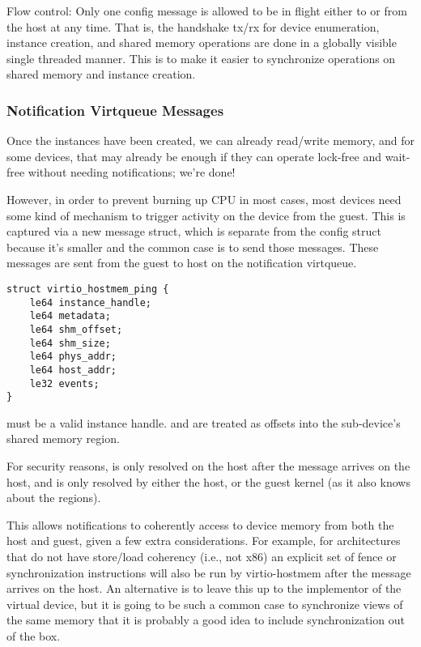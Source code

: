 Flow control: Only one config message is allowed to be in flight
either to or from the host at any time.
That is, the handshake tx/rx for device enumeration, instance creation, and shared memory operations
are done in a globally visible single threaded manner.
This is to make it easier to synchronize operations on shared memory and instance creation.

\subsubsection{Notification Virtqueue Messages}\label{sec:Device Types / Host Memory Device / Device Operation / Notification Virtqueue Messages}

Once the instances have been created,
we can already read/write memory, and for some devices, that may already be enough
if they can operate lock-free and wait-free without needing notifications; we're done!

However, in order to prevent burning up CPU in most cases,
most devices need some kind of mechanism to trigger activity on the device
from the guest. This is captured via a new message struct,
which is separate from the config struct because it's smaller and
the common case is to send those messages.
These messages are sent from the guest to host
on the notification virtqueue.

\begin{lstlisting}
struct virtio_hostmem_ping {
    le64 instance_handle;
    le64 metadata;
    le64 shm_offset;
    le64 shm_size;
    le64 phys_addr;
    le64 host_addr;
    le32 events;
}
\end{lstlisting}

 must be a valid instance handle.
 and 
are treated as offsets into the sub-device's shared memory region.

For security reasons,
 is only resolved on the host after the message arrives on the host,
and  is only resolved by either the host, or the guest kernel
(as it also knows about the regions).

This allows notifications to coherently access to device memory
from both the host and guest, given a few extra considerations.
For example, for architectures that do not have store/load coherency (i.e., not x86)
an explicit set of fence or synchronization instructions will also be run by virtio-hostmem
after the message arrives on the host.
An alternative is to leave this up to the implementor of the virtual device,
but it is going to be such a common case to synchronize views of the same memory
that it is probably a good idea to include synchronization out of the box.

